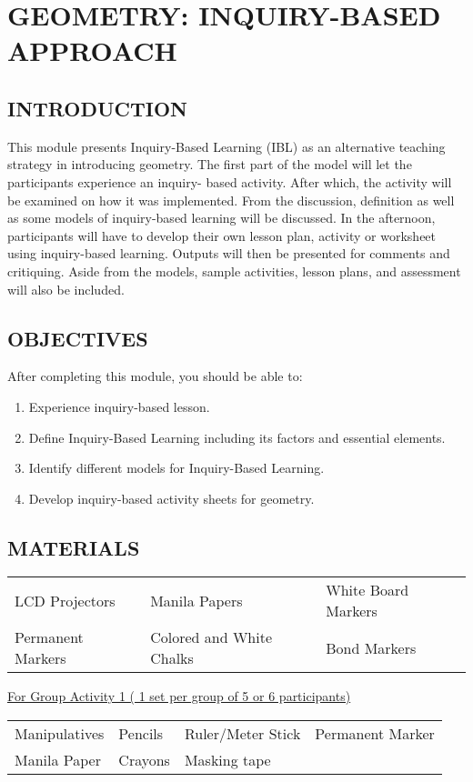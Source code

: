 \chapter{GEOMETRY: INQUIRY-BASED APPROACH}
\section*{INTRODUCTION}
This module presents Inquiry-Based Learning (IBL) as an alternative teaching strategy in
introducing geometry. The first part of the model will let the participants experience an inquiry-
based activity. After which, the activity will be examined on how it was implemented. From the
discussion, definition as well as some models of inquiry-based learning will be discussed. In the
afternoon, participants will have to develop their own lesson plan, activity or worksheet using
inquiry-based learning. Outputs will then be presented for comments and critiquing. Aside from
the models, sample activities, lesson plans, and assessment will also be included.
\section*{OBJECTIVES}
After completing this module, you should be able to:
\begin{enumerate}
\item Experience inquiry-based lesson.
\item Define Inquiry-Based Learning including its factors and essential elements.
\item Identify different models for Inquiry-Based Learning.
\item Develop inquiry-based activity sheets for geometry.
\end{enumerate}
\section*{MATERIALS}
\begin{tabular}{lll}
LCD Projectors & Manila Papers & White Board Markers\\
Permanent Markers & Colored and White Chalks & Bond Markers\\
\end{tabular}

\underline{For Group Activity 1 ( 1 set per group of 5 or 6 participants)}

\begin{tabular}{llll}
Manipulatives & Pencils & Ruler/Meter Stick & Permanent Marker\\
Manila Paper & Crayons & Masking tape & \\
\end{tabular}


